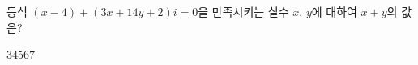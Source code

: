 등식 $(x-4)+(3x+14y+2)i=0$을 만족시키는 실수 $x$, $y$에 대하여 $x+y$의 값은?
\begin{choices32}{$3$}{$4$}{$5$}{$6$}{$7$}\end{choices32}
